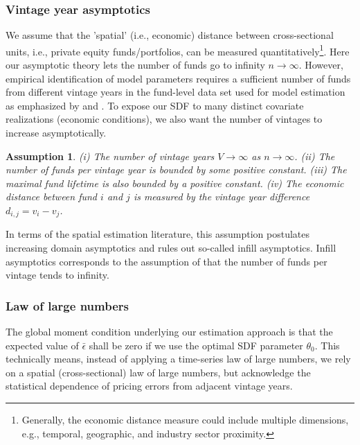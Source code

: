 \documentclass[12pt]{article}
\newtheorem{assume}{Assumption}
\begin{document}
\subsubsection{Vintage year asymptotics}
We assume that the 'spatial' (i.e., economic) distance between cross-sectional units, i.e., private equity funds/portfolios, can be measured quantitatively\footnote{Generally, the economic distance measure could include multiple dimensions, e.g., temporal, geographic, and industry sector proximity.}.
Here our asymptotic theory lets the number of funds go to infinity $n \to \infty$.
However, empirical identification of model parameters requires a sufficient number of funds from different vintage years in the fund-level data set used for model estimation as emphasized by \cite{DLP12} and \cite{KN16}.
To expose our SDF to many distinct covariate realizations (economic conditions), we also want the number of vintages to increase asymptotically.
\begin{assume}
	\label{as:vya}
	(i) The number of vintage years $V \to \infty$ as $n \to \infty$.
	(ii) The number of funds per vintage year is bounded by some positive constant.
	(iii) The maximal fund lifetime is also bounded by a positive constant.
	(iv) The economic distance between fund $i$ and $j$ is measured by the vintage year difference $d_{i,j}=v_i - v_j$.
\end{assume}
In terms of the spatial estimation literature, this assumption postulates increasing domain asymptotics and rules out so-called infill asymptotics. Infill asymptotics corresponds to the assumption of \cite{DLP12} that the number of funds per vintage tends to infinity.


\subsubsection{Law of large numbers}
The global moment condition underlying our estimation approach is that the expected value of $\bar{\epsilon}$ shall be zero if we use the optimal SDF parameter $\theta_0$. 
This technically means, instead of applying a time-series law of large numbers, we rely on a spatial (cross-sectional) law of large numbers, but acknowledge the statistical dependence of  pricing errors from adjacent vintage years.
\end{document}
